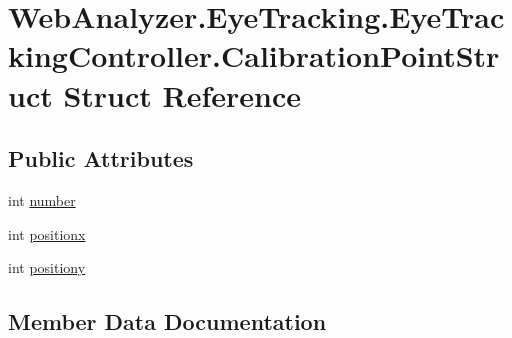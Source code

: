 \hypertarget{struct_web_analyzer_1_1_eye_tracking_1_1_eye_tracking_controller_1_1_calibration_point_struct}{}\section{Web\+Analyzer.\+Eye\+Tracking.\+Eye\+Tracking\+Controller.\+Calibration\+Point\+Struct Struct Reference}
\label{struct_web_analyzer_1_1_eye_tracking_1_1_eye_tracking_controller_1_1_calibration_point_struct}
\subsection*{Public Attributes}
\begin{DoxyCompactItemize}
\item 
int \hyperlink{struct_web_analyzer_1_1_eye_tracking_1_1_eye_tracking_controller_1_1_calibration_point_struct_a25103a5b9edcc8a34d9e8a50603f42a7}{number}
\item 
int \hyperlink{struct_web_analyzer_1_1_eye_tracking_1_1_eye_tracking_controller_1_1_calibration_point_struct_a4594f134e46d973b06bb7f89bce6c1d7}{positionx}
\item 
int \hyperlink{struct_web_analyzer_1_1_eye_tracking_1_1_eye_tracking_controller_1_1_calibration_point_struct_a968184c62ffaaee0a01706b8052635dd}{positiony}
\end{DoxyCompactItemize}


\subsection{Member Data Documentation}
\hypertarget{struct_web_analyzer_1_1_eye_tracking_1_1_eye_tracking_controller_1_1_calibration_point_struct_a25103a5b9edcc8a34d9e8a50603f42a7}{}
